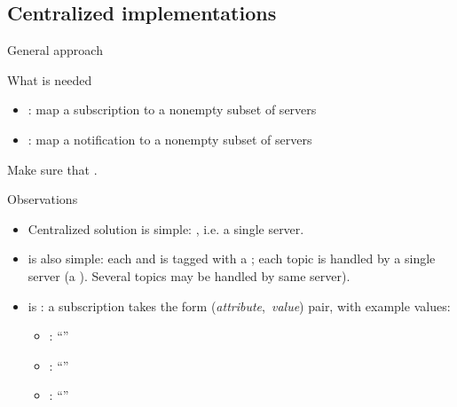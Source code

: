 \subsection{Centralized implementations}
\begin{slide}{General approach}
  \begin{block}{What is needed}
    \begin{itemize}\firmlist
    \item {}: map a subscription  to a nonempty subset  of servers
    \item {}: map a notification  to a nonempty subset  of servers
    \end{itemize}
    Make sure that .
  \end{block}
  \begin{alertblock}{Observations}
    \begin{itemize}
    \item Centralized solution is simple: , i.e. a single server.
    \item {} is also simple: each  and  is tagged with a
      ; each topic is handled by a single server (a ). Several
      topics may be handled by same server).
    \item {} is : a subscription takes the form
      (\emph{attribute},~\emph{value}) pair, with example values:
      \begin{itemize}\tightlist
      \item {}: ``''
      \item {}: ``''
      \item {}: ``''
      \end{itemize}
    \end{itemize}
  \end{alertblock}
\end{slide}
